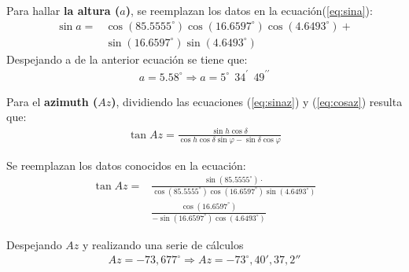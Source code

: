 \begin{multicols}{2}
Para hallar \textbf{la altura ($a$)}, se reemplazan los datos en la ecuación(\ref{eq:sina}):
\begin{align*}
    \sin a = &  \cos \left(85.5555^{\circ}\right)  \cos \left(16.6597^{\circ}\right) \cos \left(4.6493^{\circ}\right) + \\
    & \sin \left(16.6597^{\circ}\right) \sin \left(4.6493^{\circ}\right)
\end{align*}
Despejando a de la anterior ecuación se tiene que:
\begin{align*}
   a = 5.58^{\circ}  \Longrightarrow a = 5^{\circ}~~ 34^{\prime}~~ 49^{\prime \prime}
\end{align*}
   
Para el\textbf{ azimuth ($Az$)}, dividiendo las ecuaciones (\ref{eq:sinaz}) y (\ref{eq:cosaz}) resulta que:
\begin{align}
    \tan Az = \frac{\sin h \cos \delta}{\cos h \cos \delta \sin \varphi - \sin \delta \cos \varphi}
\end{align}
   
   
   
   Se reemplazan los datos conocidos en la ecuación:
   \begin{align*}
       \tan Az  = & \frac{\sin \left(85.5555^{\circ}\right) \cdot }{\cos\left(85.5555^{\circ}\right)  \cos  \left(16.6597^{\circ}\right)  \sin \left(4.6493^{\circ}\right)}\\
        & \frac{\cos  \left(16.6597^{\circ}\right)}{- \sin \left(16.6597^{\circ}\right) \cos  \left(4.6493^{\circ}\right)}
   \end{align*}
   
   
   Despejando $Az$ y realizando una serie de cálculos
   \begin{align}
   Az = -73,677 ^{\circ} \Longrightarrow
   Az = -73 ^{\circ}, 40', 37,2''  %
   \end{align}
   

\end{multicols}
